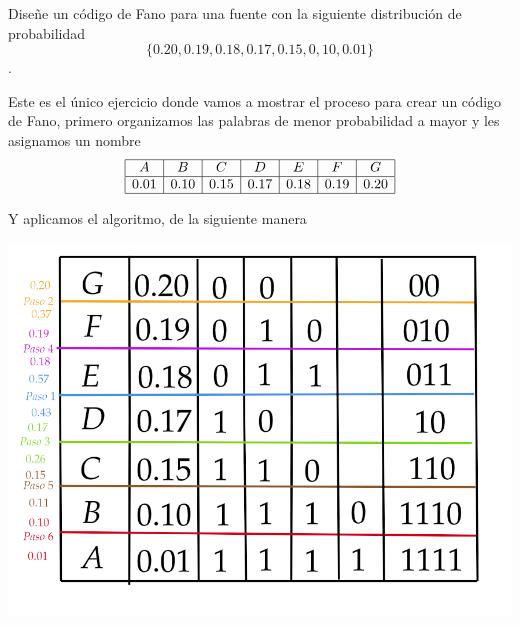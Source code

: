
Diseñe un código de Fano para una fuente con la siguiente distribución de probabilidad $$\{0.20, 0.19, 0.18, 0.17, 0.15, 0,10, 0.01\}$$.
\begin{sol}
    Este es el único ejercicio donde vamos a mostrar el proceso para crear un código de Fano, 
    primero organizamos las palabras de menor probabilidad a mayor y les asignamos un nombre
    $$
\begin{array}{|c|c|c|c|c|c|c|}
\hline
A & B & C & D & E & F & G\\
\hline
0.01& 0.10& 0.15& 0.17& 0.18& 0.19& 0.20\\
\hline

\end{array}
$$

    Y aplicamos el algoritmo, de la siguiente manera\\
    \begin{center}
     \includegraphics[scale=0.4]{diagrama.png}
    \end{center}
   
\end{sol}